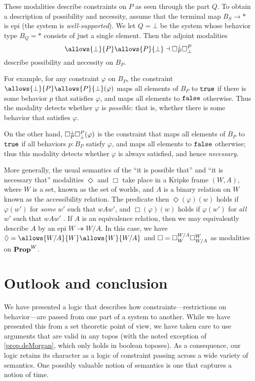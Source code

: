 These modalities describe constraints on $P$ as seen through the part $Q$. To obtain a description of possibility and necessity, assume that the terminal map $B_S\to\ast$ is epi (the system is \emph{well-supported}). We let $Q=\bot$ be the system whose behavior type $B_Q=\ast$ consists of just a single element. Then the adjoint modalities
$$\allows{\bot}{P}\allows{P}{\bot} \dashv \ensure{\bot}{P}\ensure{P}{\bot}$$
describe possibility and necessity on $B_P$. 

For example, for any constraint $\varphi$ on $B_P$, the constraint $\allows{\bot}{P}\allows{P}{\bot}(\varphi)$ maps all elements of $B_P$ to $\true$ if there is some behavior $p$ that satisfies $\varphi$, and maps all elements to $\false$ otherwise. Thus the modality detects whether $\varphi$ is \emph{possible}: that is, whether there is some behavior that satisfies $\varphi$. 

On the other hand, $\ensure{\bot}{P}\ensure{P}{\bot}(\varphi)$ is the constraint that maps all elements of $B_P$ to $\true$ if all behaviors $p : B_P$ satisfy $\varphi$, and maps all elements to $\false$ otherwise; thus this modality detects whether $\varphi$ is always satisfied, and hence \emph{necessary}.

More generally, the usual semantics of the ``it is possible that'' and ``it is necessary that'' modalities $\Diamond$ and $\Box$ take place in a Kripke frame $(W,A)$, where $W$ is a set, known as the set of worlds, and $A$ is a binary relation on $W$ known as the accessibility relation. The predicate then $\Diamond(\varphi)(w)$ holds if $\varphi(w')$ for \emph{some} $w'$ such that $wAw'$, and $\Box(\varphi)(w)$ holds if $\varphi(w')$ for \emph{all} $w'$ such that $wAw'$ \cite{kripke1963semantical}. If $A$ is an equivalence relation, then we may equivalently describe $A$ by an epi $W \twoheadrightarrow W/A$. In this case, we have $\Diamond=\allows{W/A}{W}\allows{W}{W/A}$ and $\Box= \ensure{W/A}{W}\ensure{W}{W/A}$ as modalities on $\Prop^W$. 

\section{Outlook and conclusion}
We have presented a logic that describes how constraints---restrictions on behavior---are passed from one part of a system to another. While we have presented this from a set theoretic point of view, we have taken care to use arguments that are valid in any topos (with the noted exception of \cref{prop.deMorgan}, which only holds in boolean toposes). As a consequence, our logic retains its character as a logic of constraint passing across a wide variety of semantics. One possibly valuable notion of semantics is one that captures a notion of time.

